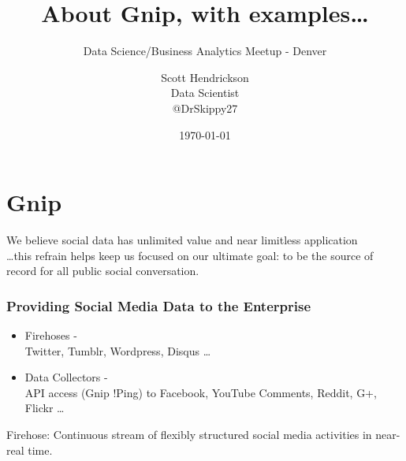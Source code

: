 \documentclass{beamer}
\begin{document}
\title{About Gnip, with examples\ldots}
\subtitle{Data Science/Business Analytics Meetup - Denver}
\author{Scott Hendrickson \\ Data Scientist \\  @DrSkippy27}
\date{\today} 


\begin{frame}
\titlepage
\end{frame}

%
%

\section{Gnip}


\begin{frame}
\begin{center}
\Large We believe social data has unlimited value and near limitless application \\ [12pt] \ldots this refrain helps keep us focused on our ultimate goal: to be the source of record for all public social conversation.
\end{center}
\end{frame}


\begin{frame}\frametitle{Providing Social Media Data to the Enterprise}
\begin{center}
\begin{itemize}
\item Firehoses - \\ Twitter, Tumblr, Wordpress, Disqus \ldots
\item Data Collectors - \\ API access (Gnip !Ping) to Facebook, YouTube Comments, Reddit, G+, Flickr \ldots
\end{itemize}
\end{center}
\end{frame}


\begin{frame}
\begin{center}
{\Large Firehose: Continuous stream of flexibly structured social media activities in near-real time.}
\end{center}
\end{frame}

\end{document}
